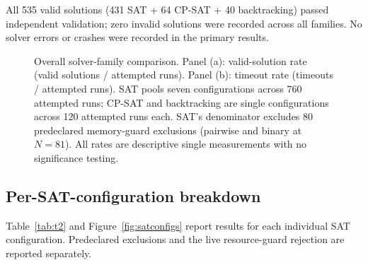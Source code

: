 \documentclass[a4paper,fleqn]{cas-sc}
\begin{document}
All 535 valid solutions (431 SAT + 64 CP-SAT + 40 backtracking) passed independent validation; zero invalid solutions were recorded across all families. No solver errors or crashes were recorded in the primary results.

\begin{figure}[htbp]
\centering

\caption{Overall solver-family comparison. Panel (a): valid-solution rate (valid solutions / attempted runs). Panel (b): timeout rate (timeouts / attempted runs). SAT pools seven configurations across 760 attempted runs; CP-SAT and backtracking are single configurations across 120 attempted runs each. SAT's denominator excludes 80 predeclared memory-guard exclusions (pairwise and binary at \(N=81\)). All rates are descriptive single measurements with no significance testing.}
\label{fig:overall}
\end{figure}

\subsection{Per-SAT-configuration breakdown}\label{sec:percfg}

Table~\ref{tab:t2} and Figure~\ref{fig:satconfigs} report results for each individual SAT configuration. Predeclared exclusions and the live resource-guard rejection are reported separately.

\begin{table}[htbp]
\centering
\caption{Per-SAT-configuration breakdown across all 120 instances. Median solve time is over successful runs only.}
\label{tab:t2}
\scriptsize
\setlength{\tabcolsep}{3pt}
\end{table}
\end{document}
